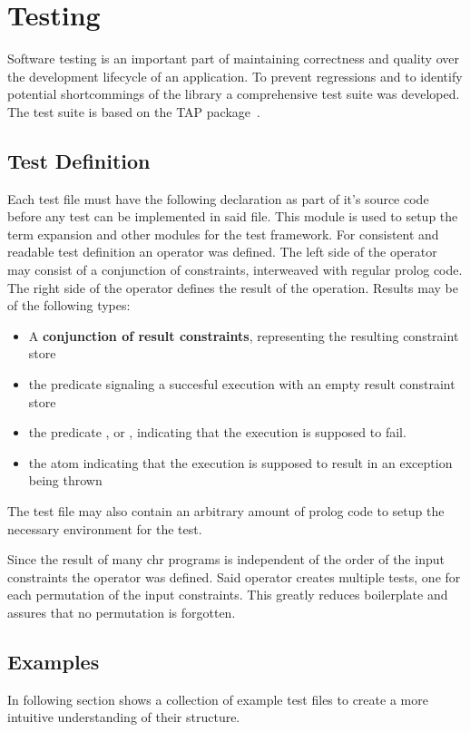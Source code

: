 \section{Testing}
Software testing is an important part of maintaining correctness and quality over the development lifecycle of an application.
To prevent regressions and to identify potential shortcommings of the {\dhr} library a comprehensive test suite was developed.
The test suite is based on the TAP package~\cite{fnogatzTap}.

\subsection{Test Definition}
Each test file must have the following declaration as part of it's source code before any test can be implemented in said file. 
This module is used to setup the term expansion and other modules for the test framework.
For consistent and readable test definition an operator  was defined.
The left side of the operator may consist of a conjunction of constraints, interweaved with regular prolog code.
The right side of the operator defines the result of the operation.
Results may be of the following types:
\begin{itemize}
\item A \textbf{conjunction of result constraints}, representing the resulting constraint store
\item the predicate \textbf{} signaling a succesful execution with an empty result constraint store
\item the predicate \textbf{}, or \textbf{}, indicating that the execution is supposed to fail.
\item the atom \textbf{} indicating that the execution is supposed to result in an exception being thrown
\end{itemize}
The test file may also contain an arbitrary amount of prolog code to setup the necessary environment for the test.

\noindent Since the result of many chr programs is independent of the order of the input constraints the operator \inlineCode{\~} was defined.
Said operator creates multiple tests, one for each permutation of the input constraints.
This greatly reduces boilerplate and assures that no permutation is forgotten.


\subsection{Examples}
In following section shows a collection of example test files to create a more intuitive understanding of their structure.
\newpage %
